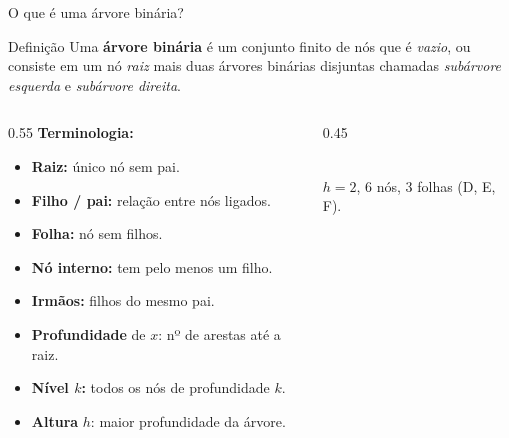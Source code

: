 \documentclass[aspectratio=169]{beamer}
\begin{document}
\begin{frame}[shrink=10]{O que é uma árvore binária?}
\begin{block}{Definição}
Uma \textbf{árvore binária} é um conjunto finito de nós que é
\emph{vazio}, ou consiste em um nó \emph{raiz} mais duas árvores
binárias disjuntas chamadas \emph{subárvore esquerda} e
\emph{subárvore direita}.
\end{block}
\begin{columns}[T]
\begin{column}{0.55\textwidth}
\textbf{Terminologia:}
\begin{itemize}\small
  \item \textbf{Raiz:} único nó sem pai.
  \item \textbf{Filho / pai:} relação entre nós ligados.
  \item \textbf{Folha:} nó sem filhos.
  \item \textbf{Nó interno:} tem pelo menos um filho.
  \item \textbf{Irmãos:} filhos do mesmo pai.
  \item \textbf{Profundidade} de $x$: nº de arestas até a raiz.
  \item \textbf{Nível $k$:} todos os nós de profundidade $k$.
  \item \textbf{Altura} $h$: maior profundidade da árvore.
\end{itemize}
\end{column}
\begin{column}{0.45\textwidth}
\centering
{}\\[2pt]
\small $h = 2$, 6 nós, 3 folhas (D, E, F).
\end{column}
\end{columns}
\end{frame}
\end{document}
